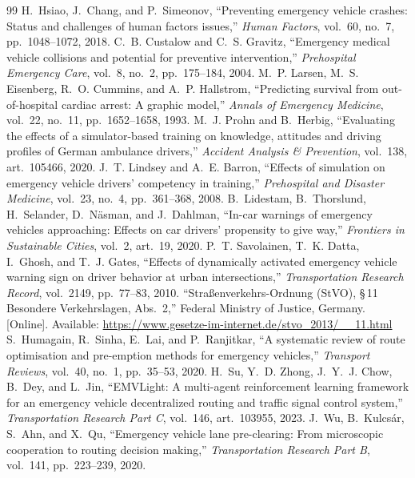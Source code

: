 \documentclass[conference,a4paper]{IEEEtran}
\begin{document}
\begin{thebibliography}{99}
\scriptsize
{} H.~Hsiao, J.~Chang, and P.~Simeonov, ``Preventing emergency vehicle crashes: Status and challenges of human factors issues,'' \emph{Human Factors}, vol.~60, no.~7, pp.~1048--1072, 2018.
 C.~B. Custalow and C.~S. Gravitz, ``Emergency medical vehicle collisions and potential for preventive intervention,'' \emph{Prehospital Emergency Care}, vol.~8, no.~2, pp.~175--184, 2004.
 M.~P. Larsen, M.~S. Eisenberg, R.~O. Cummins, and A.~P. Hallstrom, ``Predicting survival from out-of-hospital cardiac arrest: A graphic model,'' \emph{Annals of Emergency Medicine}, vol.~22, no.~11, pp.~1652--1658, 1993.
 M.~J. Prohn and B.~Herbig, ``Evaluating the effects of a simulator-based training on knowledge, attitudes and driving profiles of German ambulance drivers,'' \emph{Accident Analysis \& Prevention}, vol.~138, art.~105466, 2020.
 J.~T. Lindsey and A.~E. Barron, ``Effects of simulation on emergency vehicle drivers' competency in training,'' \emph{Prehospital and Disaster Medicine}, vol.~23, no.~4, pp.~361--368, 2008.
 B.~Lidestam, B.~Thorslund, H.~Selander, D.~N\"asman, and J.~Dahlman, ``In-car warnings of emergency vehicles approaching: Effects on car drivers' propensity to give way,'' \emph{Frontiers in Sustainable Cities}, vol.~2, art.~19, 2020.
 P.~T. Savolainen, T.~K. Datta, I.~Ghosh, and T.~J. Gates, ``Effects of dynamically activated emergency vehicle warning sign on driver behavior at urban intersections,'' \emph{Transportation Research Record}, vol.~2149, pp.~77--83, 2010.
 ``Stra{\ss}enverkehrs-Ordnung (StVO), {\S}\,11 Besondere Verkehrslagen, Abs.~2,'' Federal Ministry of Justice, Germany. [Online]. Available: \url{https://www.gesetze-im-internet.de/stvo_2013/__11.html}
 S.~Humagain, R.~Sinha, E.~Lai, and P.~Ranjitkar, ``A systematic review of route optimisation and pre-emption methods for emergency vehicles,'' \emph{Transport Reviews}, vol.~40, no.~1, pp.~35--53, 2020.
 H.~Su, Y.~D. Zhong, J.~Y.~J. Chow, B.~Dey, and L.~Jin, ``EMVLight: A multi-agent reinforcement learning framework for an emergency vehicle decentralized routing and traffic signal control system,'' \emph{Transportation Research Part C}, vol.~146, art.~103955, 2023.
 J.~Wu, B.~Kulcs\'ar, S.~Ahn, and X.~Qu, ``Emergency vehicle lane pre-clearing: From microscopic cooperation to routing decision making,'' \emph{Transportation Research Part B}, vol.~141, pp.~223--239, 2020.

\end{thebibliography}
\end{document}
